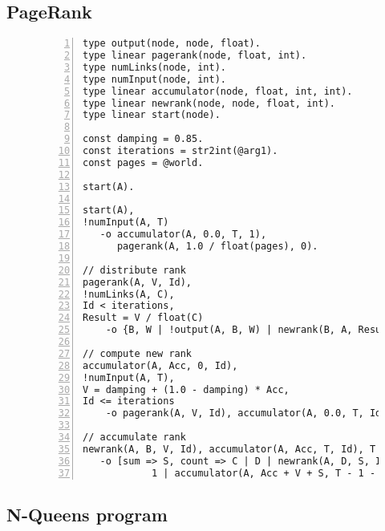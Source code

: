 \clearpage
\subsection{PageRank}\label{code:pagerank}

\begin{figure}[h!]
   \footnotesize\begin{Verbatim}[numbers=left]
type output(node, node, float).
type linear pagerank(node, float, int).
type numLinks(node, int).
type numInput(node, int).
type linear accumulator(node, float, int, int).
type linear newrank(node, node, float, int).
type linear start(node).

const damping = 0.85.
const iterations = str2int(@arg1).
const pages = @world.

start(A).

start(A),
!numInput(A, T)
   -o accumulator(A, 0.0, T, 1),
      pagerank(A, 1.0 / float(pages), 0).

// distribute rank
pagerank(A, V, Id),
!numLinks(A, C),
Id < iterations,
Result = V / float(C)
	-o {B, W | !output(A, B, W) | newrank(B, A, Result, Id + 1)}.

// compute new rank
accumulator(A, Acc, 0, Id),
!numInput(A, T),
V = damping + (1.0 - damping) * Acc,
Id <= iterations
	-o pagerank(A, V, Id), accumulator(A, 0.0, T, Id + 1).
	
// accumulate rank
newrank(A, B, V, Id), accumulator(A, Acc, T, Id), T > 0
   -o [sum => S, count => C | D | newrank(A, D, S, Id) |
            1 | accumulator(A, Acc + V + S, T - 1 - C, Id)].
\end{Verbatim}
\normalsize
\end{figure}

\clearpage
\subsection{N-Queens program}\label{code:nqueens}


